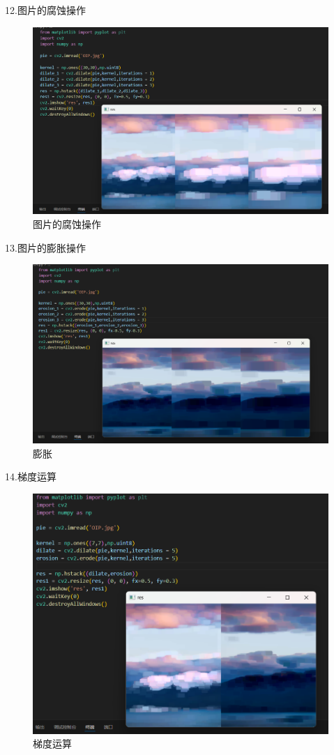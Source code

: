 \documentclass[a4paper, 12pt]{article}
\begin{document}
12.图片的腐蚀操作
\begin{figure}[H]
  \centering
  \includegraphics[width=\textwidth]{屏幕截图 2024-09-12 201525.png}
  \caption{图片的腐蚀操作}
\end{figure}

13.图片的膨胀操作
\begin{figure}[H]
  \centering
  \includegraphics[width=\textwidth]{屏幕截图 2024-09-12 201917.png}
  \caption{膨胀}
\end{figure}

14.梯度运算
\begin{figure}[H]
  \centering
  \includegraphics[width=\textwidth]{屏幕截图 2024-09-12 202112.png}
  \caption{梯度运算}
\end{figure}
\end{document}
